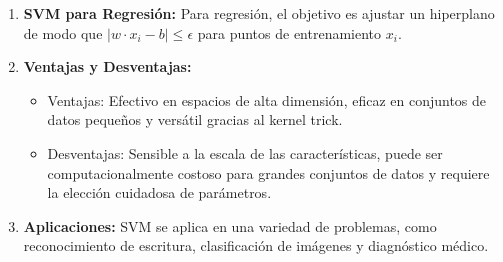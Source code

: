 \documentclass[12pt]{article}
\begin{document}
\begin{enumerate}
    \item \textbf{SVM para Regresión:}
        Para regresión, el objetivo es ajustar un hiperplano de modo que \(|w \cdot x_i - b| \leq \epsilon\) para puntos de entrenamiento \(x_i\).

    \item \textbf{Ventajas y Desventajas:}
        \begin{itemize}
            \item Ventajas: Efectivo en espacios de alta dimensión, eficaz en conjuntos de datos pequeños y versátil gracias al kernel trick.
            \item Desventajas: Sensible a la escala de las características, puede ser computacionalmente costoso para grandes conjuntos de datos y requiere la elección cuidadosa de parámetros.
        \end{itemize}

    \item \textbf{Aplicaciones:}
        SVM se aplica en una variedad de problemas, como reconocimiento de escritura, clasificación de imágenes y diagnóstico médico.
\end{enumerate}
    
    
  
\end{document}
